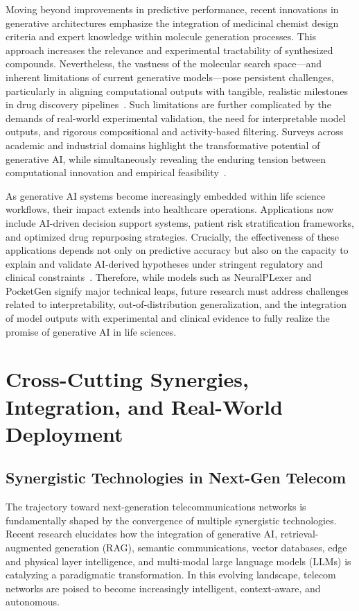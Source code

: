 Moving beyond improvements in predictive performance, recent innovations in generative architectures emphasize the integration of medicinal chemist design criteria and expert knowledge within molecule generation processes. This approach increases the relevance and experimental tractability of synthesized compounds. Nevertheless, the vastness of the molecular search space---and inherent limitations of current generative models---pose persistent challenges, particularly in aligning computational outputs with tangible, realistic milestones in drug discovery pipelines~\cite{ref6}. Such limitations are further complicated by the demands of real-world experimental validation, the need for interpretable model outputs, and rigorous compositional and activity-based filtering. Surveys across academic and industrial domains highlight the transformative potential of generative AI, while simultaneously revealing the enduring tension between computational innovation and empirical feasibility~\cite{ref6,ref26}.

As generative AI systems become increasingly embedded within life science workflows, their impact extends into healthcare operations. Applications now include AI-driven decision support systems, patient risk stratification frameworks, and optimized drug repurposing strategies. Crucially, the effectiveness of these applications depends not only on predictive accuracy but also on the capacity to explain and validate AI-derived hypotheses under stringent regulatory and clinical constraints~\cite{ref26}. Therefore, while models such as NeuralPLexer and PocketGen signify major technical leaps, future research must address challenges related to interpretability, out-of-distribution generalization, and the integration of model outputs with experimental and clinical evidence to fully realize the promise of generative AI in life sciences.

\section{Cross-Cutting Synergies, Integration, and Real-World Deployment}

\subsection{Synergistic Technologies in Next-Gen Telecom}

The trajectory toward next-generation telecommunications networks is fundamentally shaped by the convergence of multiple synergistic technologies. Recent research elucidates how the integration of generative AI, retrieval-augmented generation (RAG), semantic communications, vector databases, edge and physical layer intelligence, and multi-modal large language models (LLMs) is catalyzing a paradigmatic transformation. In this evolving landscape, telecom networks are poised to become increasingly intelligent, context-aware, and autonomous.

